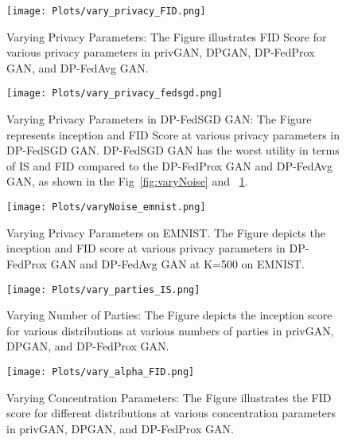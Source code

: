 \begin{figure}
 \centering
 \texttt{[image: Plots/vary\_privacy\_FID.png]}
 \caption{Varying Privacy Parameters: The Figure illustrates FID Score for various privacy parameters in privGAN, DPGAN, DP-FedProx GAN, and DP-FedAvg GAN.}
 \label{fig:vary_privacy_FID}
\end{figure}


\begin{figure}
 \centering
 \texttt{[image: Plots/vary\_privacy\_fedsgd.png]}
 \caption{Varying Privacy Parameters in DP-FedSGD GAN: The Figure represents inception  and FID Score at various privacy parameters in DP-FedSGD GAN. DP-FedSGD GAN has the worst utility in terms of IS and FID compared to the DP-FedProx GAN and DP-FedAvg GAN, as shown in the Fig~\ref{fig:varyNoise} and ~\ref{fig:vary_privacy_FID}.} 
 \label{fig:vary_privacy_fedsgd}
\end{figure}


\begin{figure}
 \centering
 \texttt{[image: Plots/varyNoise\_emnist.png]}
	\caption{\small Varying Privacy Parameters on EMNIST. The Figure depicts the inception and FID score  at various privacy parameters in DP-FedProx GAN and DP-FedAvg GAN at K=500 on EMNIST. }
 \label{fig:varyNoise_emnist}
\end{figure}

\begin{figure}
 \centering
 \texttt{[image: Plots/vary\_parties\_IS.png]}
 \caption{Varying Number of Parties: The Figure depicts the inception score for various distributions at various numbers of parties in privGAN, DPGAN, and DP-FedProx GAN.}

 
 \label{fig:vary_parties_IS}
\end{figure}




\begin{figure}
 \centering
 \texttt{[image: Plots/vary\_alpha\_FID.png]}
 \caption{Varying Concentration Parameters: The Figure illustrates the FID score for different distributions at various concentration parameters in privGAN, DPGAN, and DP-FedProx GAN. }
 \label{fig:vary_alpha_FID}
\end{figure}




